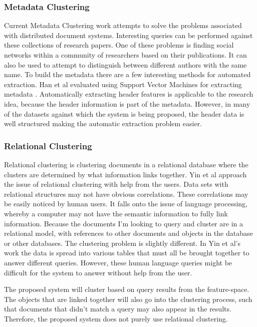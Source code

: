 \documentclass[11pt]{article}
\begin{document}
\subsubsection{Metadata Clustering}

Current Metadata Clustering work attempts to solve the problems associated with distributed document systems.
Interesting queries can be performed against these collections of research papers.
One of these problems is finding social networks within a community of researchers based on their publications.
It can also be used to attempt to distinguish between different authors with the same name.
To build the metadata there are a few interesting methods for automated extraction.
Han et al evaluated using Support Vector Machines for extracting metadata \cite{Han2003}.
Automatically extracting header features is applicable to the research idea, because the header information is part of the metadata.
However, in many of the datasets against which the system is being proposed, the header data is well structured making the automatic extraction problem easier.

\subsubsection{Relational Clustering}

Relational clustering is clustering documents in a relational database where the clusters are determined by what information links together.
Yin et al \cite{Yin2005} approach the issue of relational clustering with help from the users.
Data sets with relational structures may not have obvious correlations.
These correlations may be easily noticed by human users.
It falls onto the issue of language processing, whereby a computer may not have the semantic information to fully link information.
Because the documents I'm looking to query and cluster are in a relational model, with references to other documents and objects in the database or other databases.
The clustering problem is slightly different.
In Yin et al's work the data is spread into various tables that must all be brought together to answer different queries.
However, these human language queries might be difficult for the system to answer without help from the user.

The proposed system will cluster based on query results from the feature-space.
The objects that are linked together will also go into the clustering process, such that documents that didn't match a query may also appear in the results.
Therefore, the proposed system does not purely use relational clustering.
\end{document}

